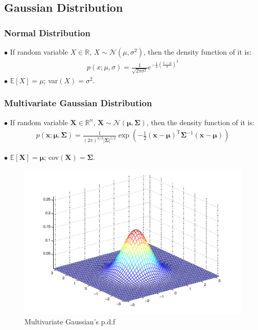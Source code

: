 \documentclass[10pt]{article}
\begin{document}
\subsection{Gaussian Distribution}
\subsubsection{Normal Distribution}
$\bullet$ If random variable $ X \in \mathbb{R}$, $ X\sim \mathcal{N}(\mu,\sigma^2)$, then the density function of it is:
\begin{align*}
    p(x;\mu,\sigma) = \frac{1}{\sqrt{2\pi\sigma^2}}e^{-\frac{1}{2} \left(\frac{x-\mu}{\sigma}\right)^2}
\end{align*}
$\bullet$ $\mathbb{E}[X] = \mu$; var$(X) = \sigma^2$.

\subsubsection{Multivariate Gaussian Distribution}
$\bullet$ If random variable $\bm{X}\in \mathbb{R}^{n}$, $ \bm{X}\sim \mathcal{N}(\bm{\mu},\bm{\Sigma})$, then the density function of it is:
\begin{align*}
    p(\bm{x};\bm{\mu},\bm{\Sigma}) = \frac{1}{(2\pi)^{n/2}|\bm{\Sigma}|^{1/2}}\exp{\left(-\frac{1}{2}(\bm{x}-\bm{\mu})^{\mathrm{T}}\bm{\Sigma}^{-1}(\bm{x}-\bm{\mu})\right)}
\end{align*}

$\bullet$ $\mathbb{E}[\bm{X}] = \bm{\mu}$; cov$(\bm{X}) = \bm{\Sigma}$.

\begin{figure}[htp]
\centering
\includegraphics[width=0.75\linewidth]{multigaussian.png}
\caption{Multivariate Gaussian's p.d.f}
\end{figure}
\end{document}
